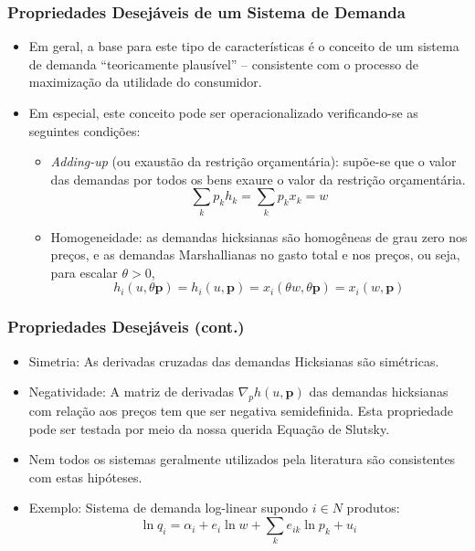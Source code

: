 \documentclass{beamer}
\begin{document}
\begin{frame}\frametitle{Propriedades Desejáveis de um Sistema de Demanda}
\small
\begin{itemize}
\item Em geral, a base para este tipo de características é o conceito de um sistema de demanda ``teoricamente plausível'' -- consistente com o processo de maximização da utilidade do consumidor. 
\item Em especial, este conceito pode ser operacionalizado verificando-se
as seguintes condições:

\begin{itemize}
\item \emph{Adding-up} (ou exaustão da restrição orçamentária): supõe-se
que o valor das demandas por todos os bens exaure o valor da restrição
orçamentária. 
\[
\sum_{k}p_{k}h_{k}=\sum_{k}p_{k}x_{k}=w
\]
\item Homogeneidade: as demandas hicksianas são homogêneas de grau zero
nos preços, e as demandas Marshallianas no gasto total e nos preços,
ou seja, para escalar $\theta>0$, 
\[
h_{i}(u,\theta\mathbf{p})=h_{i}(u,\mathbf{p})=x_{i}(\theta w,\theta\mathbf{p})=x_{i}(w,\mathbf{p})
\]
\end{itemize}
\end{itemize}
\end{frame}

\begin{frame}\frametitle{Propriedades Desejáveis (cont.)}
\begin{itemize}
\item Simetria: As derivadas cruzadas das demandas Hicksianas são simétricas.
\item Negatividade: A matriz de derivadas $\nabla_{p}h(u,\mathbf{p})$ das demandas hicksianas com relação aos preços tem que ser negativa semidefinida. Esta propriedade pode ser testada por meio da nossa querida Equação de Slutsky.
\item Nem todos os sistemas geralmente utilizados pela literatura são consistentes
com estas hipóteses.
\item Exemplo: Sistema de demanda log-linear supondo $i\in N$ produtos:
\[
\ln q_{i}=\alpha_{i}+e_{i}\ln w+\sum_{k}e_{ik}\ln p_{k}+u_{i}
\]
\end{itemize}
\end{frame}
\end{document}
